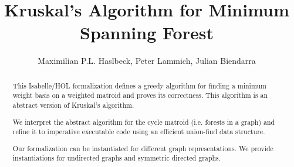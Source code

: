 \documentclass[11pt,a4paper]{article}
\begin{document}
\title{Kruskal's Algorithm for Minimum Spanning Forest}
\author{Maximilian P.L. Haslbeck, Peter Lammich, Julian Biendarra}
\maketitle

\begin{abstract}
This Isabelle/HOL formalization defines a greedy algorithm for finding a minimum weight basis
on a weighted matroid and proves its correctness.
This algorithm is an abstract version of Kruskal's algorithm.

We interpret the abstract algorithm for the cycle matroid (i.e. forests in a graph)
and refine it to imperative executable code using an efficient union-find data structure. 

Our formalization can be instantiated for different graph representations.
We provide instantiations for undirected graphs and symmetric directed graphs.
\end{abstract}

\tableofcontents


\end{document}

